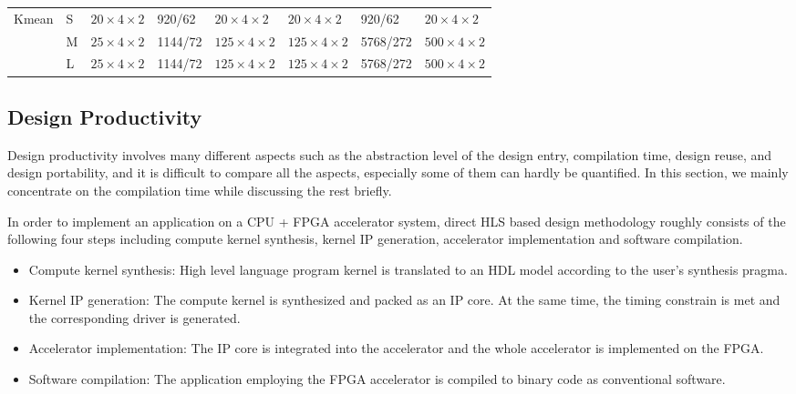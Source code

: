 \begin{table}[htpb]
{\begin{tabular}{l|l|l|l|l|l|l|l}
\multirow{3}{*}{Kmean} & S & $20 \times 4 \times 2$ & 920/62 & $20 \times 4 \times 2$ & $20 \times 4 \times 2$ & 920/62 & $20 \times 4 \times 2$  \\ \cline{2-8} 
                 & M & $25 \times 4 \times 2$ & 1144/72 & $125 \times 4 \times 2$ & $125 \times 4 \times 2$ & 5768/272 & $500 \times 4 \times 2$  \\ \cline{2-8} 
                 & L & $25 \times 4 \times 2$ & 1144/72 & $125 \times 4 \times 2$ & $125 \times 4 \times 2$ & 5768/272 & $500 \times 4 \times 2$   \\ \hline
\end{tabular}
}
\end{table}

\subsection{Design Productivity}
Design productivity involves many different aspects such as the abstraction level of the design entry, compilation time, design reuse, and design portability, and it is difficult to compare all the aspects, especially some of them can hardly be quantified. In this section, we mainly concentrate on the compilation time while discussing the rest briefly.

In order to implement an application on a CPU + FPGA accelerator system, direct HLS based design methodology roughly consists of the following four steps including compute kernel synthesis, kernel IP generation, accelerator implementation and software compilation.
 
\begin{itemize}
\renewcommand\labelitemi{$\bullet$}
\setlength\itemindent{1em}
\item Compute kernel synthesis: High level language program kernel is translated to an HDL model according to the user's synthesis pragma. 
\item Kernel IP generation: The compute kernel is synthesized and packed as an IP core. At the same time, the timing constrain is met and the corresponding driver is generated. 
\item Accelerator implementation: The IP core is integrated into the accelerator and the whole accelerator is implemented on the FPGA. 
\item Software compilation: The application employing the FPGA accelerator is compiled to binary code as conventional software.
\end{itemize}


